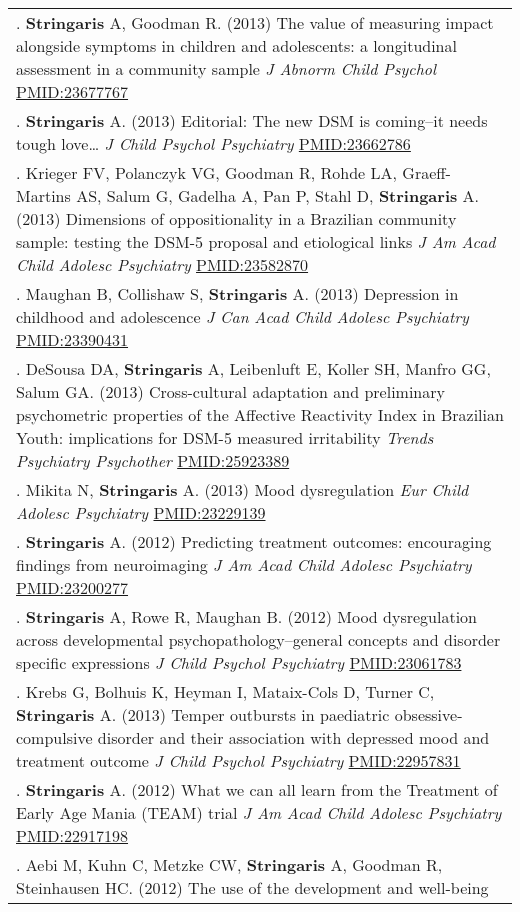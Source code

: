 \documentclass[
]{article}
\begin{document}
\begin{longtable}[]{@{}
  >{\raggedright\arraybackslash}p{}@{}}
164. \textbf{Stringaris} A, Goodman R. (2013) The value of measuring
impact alongside symptoms in children and adolescents: a longitudinal
assessment in a community sample \emph{J Abnorm Child Psychol}
\url{PMID:23677767} \\
165. \textbf{Stringaris} A. (2013) Editorial: The new DSM is coming--it
needs tough love\ldots{} \emph{J Child Psychol Psychiatry}
\url{PMID:23662786} \\
166. Krieger FV, Polanczyk VG, Goodman R, Rohde LA, Graeff-Martins AS,
Salum G, Gadelha A, Pan P, Stahl D, \textbf{Stringaris} A. (2013)
Dimensions of oppositionality in a Brazilian community sample: testing
the DSM-5 proposal and etiological links \emph{J Am Acad Child Adolesc
Psychiatry} \url{PMID:23582870} \\
167. Maughan B, Collishaw S, \textbf{Stringaris} A. (2013) Depression in
childhood and adolescence \emph{J Can Acad Child Adolesc Psychiatry}
\url{PMID:23390431} \\
168. DeSousa DA, \textbf{Stringaris} A, Leibenluft E, Koller SH, Manfro
GG, Salum GA. (2013) Cross-cultural adaptation and preliminary
psychometric properties of the Affective Reactivity Index in Brazilian
Youth: implications for DSM-5 measured irritability \emph{Trends
Psychiatry Psychother} \url{PMID:25923389} \\
169. Mikita N, \textbf{Stringaris} A. (2013) Mood dysregulation
\emph{Eur Child Adolesc Psychiatry} \url{PMID:23229139} \\
170. \textbf{Stringaris} A. (2012) Predicting treatment outcomes:
encouraging findings from neuroimaging \emph{J Am Acad Child Adolesc
Psychiatry} \url{PMID:23200277} \\
171. \textbf{Stringaris} A, Rowe R, Maughan B. (2012) Mood dysregulation
across developmental psychopathology--general concepts and disorder
specific expressions \emph{J Child Psychol Psychiatry}
\url{PMID:23061783} \\
172. Krebs G, Bolhuis K, Heyman I, Mataix-Cols D, Turner C,
\textbf{Stringaris} A. (2013) Temper outbursts in paediatric
obsessive-compulsive disorder and their association with depressed mood
and treatment outcome \emph{J Child Psychol Psychiatry}
\url{PMID:22957831} \\
173. \textbf{Stringaris} A. (2012) What we can all learn from the
Treatment of Early Age Mania (TEAM) trial \emph{J Am Acad Child Adolesc
Psychiatry} \url{PMID:22917198} \\
174. Aebi M, Kuhn C, Metzke CW, \textbf{Stringaris} A, Goodman R,
Steinhausen HC. (2012) The use of the development and well-being

\end{longtable}
\end{document}
